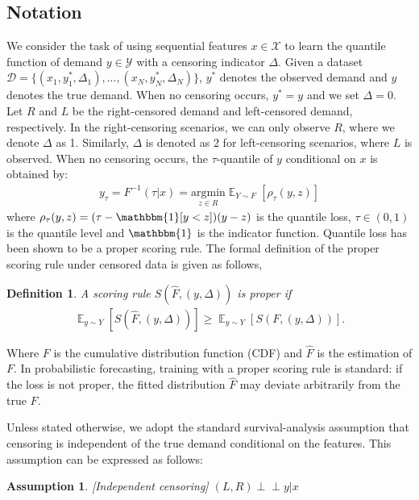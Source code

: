 \documentclass[sigconf]{acmart}
\newtheorem{assumption}{Assumption}[section]
\newtheorem{definition}{Definition}[section]
\newcommand{\indep}{\perp \!\!\! \perp}
\begin{document}
\subsection{Notation}
We consider the task of using sequential features $x \in \mathcal{X}$ to learn the quantile function of demand $y \in \mathcal{Y}$ with a censoring indicator $\Delta$. Given a dataset $\mathcal{D} = \{(x_1, y_1^{*}, \Delta_1), ..., (x_N, y_N^{*}, \Delta_N) \}$, $y^{*}$ denotes the observed demand and $y$ denotes the true demand. When no censoring occurs, $y^* = y$ and we set $\Delta = 0$. Let $R$ and $L$ be the right-censored demand and left-censored demand, respectively. In the right-censoring scenarios, we can only observe $R$, where we denote $\Delta$ as 1. Similarly, $\Delta$ is denoted as 2 for left-censoring scenarios, where $L$ is observed. When no censoring occurs, the $\tau$-quantile of $y$ conditional on $x$ is obtained by:
\begin{align*}
y_\tau = F^{-1}(\tau|x) = \underset{z \in R}{\mathrm{argmin}} \mathop{\mathbb{E}}_{Y \sim F}[\rho_\tau(y, z)]
\end{align*}
where $\rho_\tau(y, z) = (\tau - \mathbbm{1}[y < z])(y - z)$ is the quantile loss, $\tau \in (0, 1)$ is the quantile level and $\mathbbm{1}$ is the indicator function\citep{koenker1978regression}. Quantile loss has been shown to be a proper scoring rule\citep{gneiting2007strictly}. The formal definition of the proper scoring rule under censored data is given as follows\citep{yanagisawa2023proper},
\begin{definition}
    A scoring rule $ S(\hat{F}, (y, \Delta))$ is proper if 
    \begin{align*}
        \mathop{\mathbb{E}}_{y \sim Y}[S(\hat{F}, (y, \Delta))] \ge \mathop{\mathbb{E}}_{y \sim Y}[S(F, (y, \Delta))].
    \end{align*}
\end{definition}
Where $F$ is the cumulative distribution function (CDF) and $\hat{F}$ is the estimation of $F$. In probabilistic forecasting, training with a proper scoring rule is standard: if the loss is not proper, the fitted distribution $\hat{F}$ may deviate arbitrarily from the true $F$.

Unless stated otherwise, we adopt the standard survival-analysis assumption that censoring is independent of the true demand conditional on the features. This assumption can be expressed as follows:
\begin{assumption}\label{asu:asu1}
    [Independent censoring] $(L,R) \indep y|x$
\end{assumption}
\end{document}
